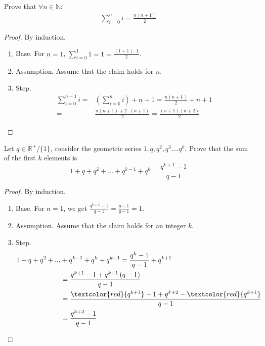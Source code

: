 \begin{example} 
  \label{example:sumweak}
Prove that $ \forall n \in  \mathbb{N}$: 
  \begin{equation*}
    \begin{split}
  \sum_{i=0}^{n}{i} = \frac{n(n+1)}{2}
    \end{split}
  \end{equation*}
  \begin{proof} By induction.
  \begin{enumerate}
    \item Base. For \(n = 1\), \(\sum_{i=0}^{1}{1} = 1 = \frac{(1+1)\cdot 1}{2} \). 
      \item Assumption. Assume that the claim holds for \(n\). 
      \item Step. 
\begin{equation*}
  \begin{split}
 \sum_{i=0}^{n+1}{i} = & \left( \sum_{i=0}^{n}{i} \right) + n+1 = \frac{n(n+1)}{2} + n + 1 \\
 = & \frac{n(n+1) + 2\cdot (n+1)}{2} = \frac{(n+1)(n+2)}{2} 
  \end{split}
\end{equation*}
  \end{enumerate}
\end{proof}
\end{example}
\begin{example} 
  \label{example:sumweak2}
  Let \(q\in \mathbb{R}^{+} / \{1\}\), consider the geometric series \( 1,q,q^2,q^3....q^k\). Prove that the sum of the first \(k\) elements is \begin{equation*}
     1+q+q^2+...+q^{k-1}+q^k = \frac{q^{k+1}-1}{q-1}
\end{equation*}

\begin{proof} By induction. 
  \begin{enumerate}
    \item      Base. For \(n = 1\), we get \( \frac{q^{k+1}-1}{q-1} = \frac{q-1}{q-1} = 1\). 
    \item      Assumption. Assume that the claim holds for an integer \(k\). 
    \item      Step. 
      \begin{equation*}
	\begin{split}
	  1+q+q^2+... & + q^{k-1}+q^k + q^{k+1} =  \frac{q^{k}-1}{q-1} + q^{k+1}  \\
	  &= \frac{q^{k+1}-1 +q^{k+1}\left(q-1\right) }{q-1}  \\ &=\frac{\textcolor{red}{q^{k+1}}-1 +q^{k+2} - \textcolor{red}{q^{k+1}}  }{q-1} \\ &= \frac{q^{k+2}-1}{q-1} 
	\end{split}
      \end{equation*}
  \end{enumerate}
\end{proof}
\end{example}
